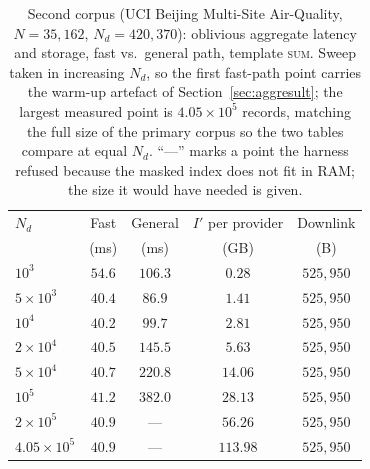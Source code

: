 \documentclass[journal]{IEEEtran}
\begin{document}
\begin{table}[t]
\centering
\caption{Second corpus (UCI Beijing Multi-Site Air-Quality, $N=35{,}162$,
$N_d=420{,}370$): oblivious aggregate latency and storage, fast vs.\ general
path, template \textsc{sum}. Sweep taken in increasing $N_d$, so the first
fast-path point carries the warm-up artefact of Section~\ref{sec:aggresult};
the largest measured point is $4.05\times10^5$ records, matching the full size
of the primary corpus so the two tables compare at equal $N_d$. ``---'' marks a
point the harness refused because the masked index does not fit in RAM; the
size it would have needed is given.}
\label{tab:beijing}
\footnotesize
\renewcommand{\arraystretch}{1.2}
\begin{tabular*}{\columnwidth}{@{\extracolsep{\fill}}lcccc@{}}
\toprule
$N_d$ & Fast & General & $I'$ per provider & Downlink \\
      & (ms) & (ms)     & (GB)              & (B) \\
\midrule
$10^3$             & $54.6$ & $106.3$ & $0.28$   & $525{,}950$ \\
$5\times10^3$      & $40.4$ & $86.9$  & $1.41$   & $525{,}950$ \\
$10^4$             & $40.2$ & $99.7$  & $2.81$   & $525{,}950$ \\
$2\times10^4$      & $40.5$ & $145.5$ & $5.63$   & $525{,}950$ \\
$5\times10^4$      & $40.7$ & $220.8$ & $14.06$  & $525{,}950$ \\
$10^5$             & $41.2$ & $382.0$ & $28.13$  & $525{,}950$ \\
$2\times10^5$      & $40.9$ & ---     & $56.26$  & $525{,}950$ \\
$4.05\times10^5$   & $40.9$ & ---     & $113.98$ & $525{,}950$ \\
\bottomrule
\end{tabular*}
\end{table}
\end{document}
